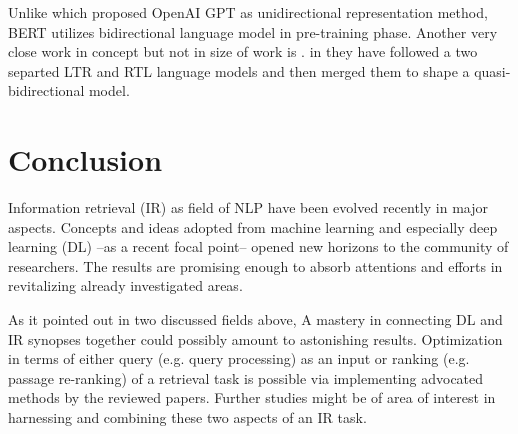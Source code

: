\documentclass[letterpaper,12pt]{article}
\begin{document}
Unlike \cite{Radford} which proposed OpenAI GPT as unidirectional representation method, BERT utilizes bidirectional language model in pre-training phase. Another very close work in concept but not in size of work is \cite{Peters2018}. in \cite{Peters2018} they have followed a two separted LTR and RTL language models and then merged them to shape a quasi-bidirectional model.


\section{Conclusion}
Information retrieval (IR) as field of NLP have been evolved recently in major aspects. Concepts and ideas adopted from machine learning and especially deep learning (DL) --as a recent focal point-- opened new horizons to the community of researchers. The results are promising enough to absorb attentions and efforts in revitalizing already investigated areas. 

As it pointed out in two discussed fields above, A mastery in connecting DL and IR synopses together could possibly amount to astonishing results. Optimization in terms of either query (e.g. query processing) as an input or ranking (e.g. passage re-ranking) of a retrieval task is possible via implementing advocated methods by the reviewed papers. Further studies might be of area of interest in harnessing and combining these two aspects of an IR task.



\end{document}
